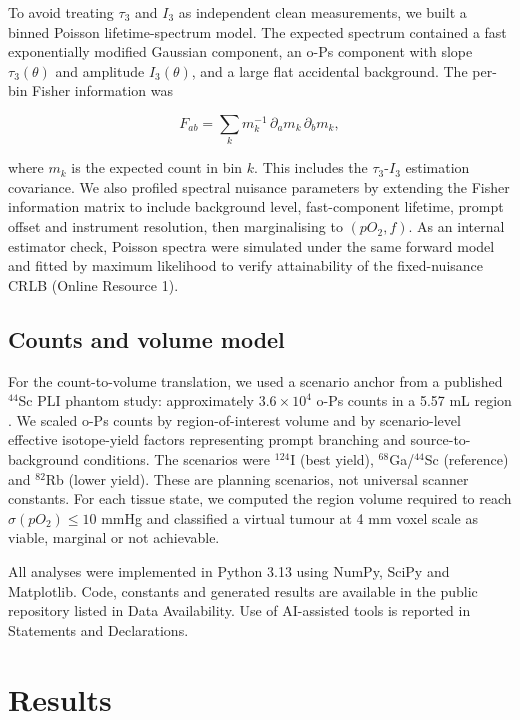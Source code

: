 \documentclass[pdflatex,sn-mathphys-num]{sn-jnl}
\begin{document}
To avoid treating \(\tau_3\) and \(I_3\) as independent clean measurements, we built a binned Poisson lifetime-spectrum model. The expected spectrum contained a fast exponentially modified Gaussian component, an o-Ps component with slope \(\tau_3(\theta)\) and amplitude \(I_3(\theta)\), and a large flat accidental background. The per-bin Fisher information was

\[F_{ab} = \sum_k m_k^{-1}\,\partial_a m_k\,\partial_b m_k,\]

where \(m_k\) is the expected count in bin \(k\). This includes the \(\tau_3\)-\(I_3\) estimation covariance. We also profiled spectral nuisance parameters by extending the Fisher information matrix to include background level, fast-component lifetime, prompt offset and instrument resolution, then marginalising to \((pO_2,f)\). As an internal estimator check, Poisson spectra were simulated under the same forward model and fitted by maximum likelihood to verify attainability of the fixed-nuisance CRLB (Online Resource 1).

\subsection{Counts and volume model}\label{counts-and-volume-model}

For the count-to-volume translation, we used a scenario anchor from a published \(^{44}\)Sc PLI phantom study: approximately \(3.6\times10^4\) o-Ps counts in a 5.57 mL region \cite{ref18}. We scaled o-Ps counts by region-of-interest volume and by scenario-level effective isotope-yield factors representing prompt branching and source-to-background conditions. The scenarios were \(^{124}\)I (best yield), \(^{68}\)Ga/\(^{44}\)Sc (reference) and \(^{82}\)Rb (lower yield). These are planning scenarios, not universal scanner constants. For each tissue state, we computed the region volume required to reach \(\sigma(pO_2)\leq10\) mmHg and classified a virtual tumour at 4 mm voxel scale as viable, marginal or not achievable.

All analyses were implemented in Python 3.13 using NumPy, SciPy and Matplotlib. Code, constants and generated results are available in the public repository listed in Data Availability. Use of AI-assisted tools is reported in Statements and Declarations.

\section{Results}\label{results}
\end{document}
